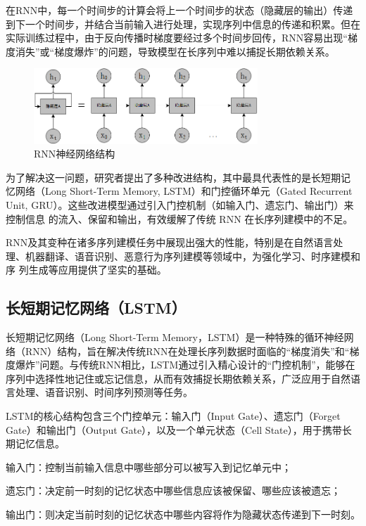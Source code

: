 在RNN中，每一个时间步的计算会将上一个时间步的状态（隐藏层的输出）传递到下一个时间步，并结合当前输入进行处理，实现序列中信息的传递和积累。但在实际训练过程中，由于反向传播时梯度要经过多个时间步回传，RNN容易出现“梯度消失”或“梯度爆炸”的问题，导致模型在长序列中难以捕捉长期依赖关系。

\begin{figure}[hbt]
	\centering
	\includegraphics[width=0.75\textwidth]{figures/2.4}
	\caption{RNN神经网络结构}\label{fig:2.4}
\end{figure}

为了解决这一问题，研究者提出了多种改进结构，其中最具代表性的是长短期记
忆网络（Long Short-Term Memory, LSTM）和门控循环单元（Gated Recurrent Unit, GRU）。这些改进模型通过引入门控机制（如输入门、遗忘门、输出门）来控制信息
的流入、保留和输出，有效缓解了传统 RNN 在长序列建模中的不足。

RNN及其变种在诸多序列建模任务中展现出强大的性能，特别是在自然语言处
理、机器翻译、语音识别、恶意行为序列建模等领域中，为强化学习、时序建模和序
列生成等应用提供了坚实的基础。

\subsection{长短期记忆网络（LSTM）}

长短期记忆网络（Long Short-Term Memory，LSTM）\cite{graves2012long}是一种特殊的循环神经网络（RNN）结构，旨在解决传统RNN在处理长序列数据时面临的“梯度消失”和“梯度爆炸”问题。与传统RNN相比，LSTM通过引入精心设计的“门控机制”，能够在序列中选择性地记住或忘记信息，从而有效捕捉长期依赖关系，广泛应用于自然语言处理、语音识别、时间序列预测等任务。

LSTM的核心结构包含三个门控单元：输入门（Input Gate）、遗忘门（Forget Gate）和输出门（Output Gate），以及一个单元状态（Cell State），用于携带长期记忆信息。

输入门：控制当前输入信息中哪些部分可以被写入到记忆单元中；

遗忘门：决定前一时刻的记忆状态中哪些信息应该被保留、哪些应该被遗忘；

输出门：则决定当前时刻的记忆状态中哪些内容将作为隐藏状态传递到下一时刻。

